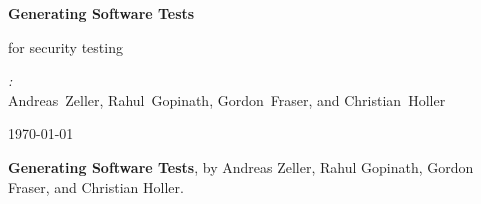 \documentclass[10pt,parskip=half,
	toc=sectionentrywithdots,
	bibliography=totocnumbered,
	captions=tableheading,numbers=noendperiod]{scrartcl}
\begin{document}
		\begin{titlepage}

	\begin{center}

	\vspace*{1cm}

	\Huge\textbf{Generating Software Tests}

	\vspace{0.5cm}\LARGE{for security testing}

	\vspace{1.5cm}

	\begin{minipage}{0.8\textwidth}
		\begin{center}
		\begin{minipage}{0.39\textwidth}
		\begin{flushleft} \Large
		\emph{:}\\Andreas Zeller, Rahul Gopinath, Gordon Fraser, and Christian Holler\\
		\end{flushleft}
		\end{minipage}
		\hspace{\fill}
		\begin{minipage}{0.39\textwidth}
		\begin{flushright} \Large
		\end{flushright}
		\end{minipage}
		\end{center}
	\end{minipage}

	\vfill

	\begin{minipage}{0.8\textwidth}
	\begin{center}
	\end{center}
	\end{minipage}

	\vspace{0.8cm}

	\vspace{0.4cm}

	\today

	\end{center}
	\end{titlepage}

		\begingroup
    \let\cleardoublepage\relax
    \let\clearpage\relax\tableofcontents
    \endgroup

\vfill

\textbf{Generating Software Tests}, by Andreas Zeller, Rahul Gopinath,
Gordon Fraser, and Christian Holler.
\end{document}
